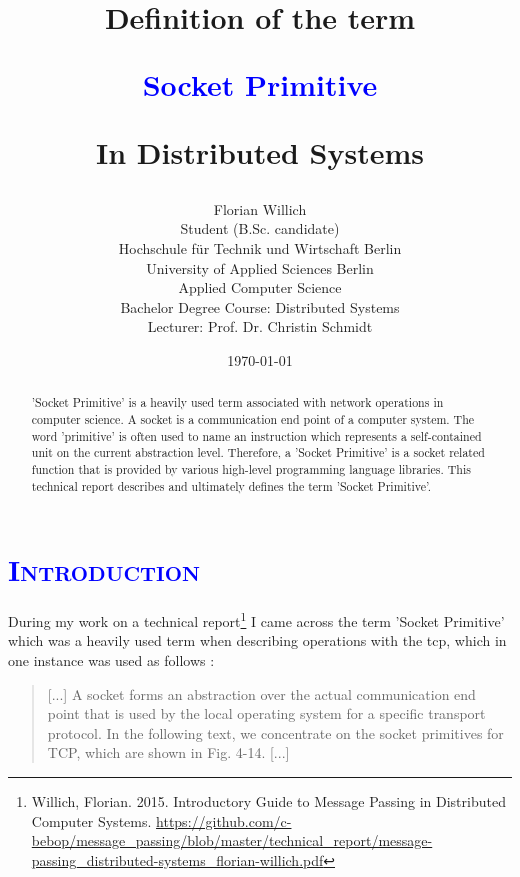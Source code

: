 \documentclass[xcolor=dvipsnames]{article}
\title{
\scshape{
\begin{large}
\textbf{Definition of the term}\\
\end{large}
\vspace{-4pt}
\textbf{\textcolor{blue}{Socket Primitive}}\\
\begin{large}
\vspace{-6pt}
In Distributed Systems
\end{large}
}}
\author{Florian Willich \\ Student (B.Sc. candidate) \\ Hochschule f\"ur Technik und Wirtschaft Berlin \\ University of Applied Sciences Berlin \\ Applied Computer Science \\ Bachelor Degree Course: Distributed Systems \\ Lecturer: Prof. Dr. Christin Schmidt}
\date{\today}
\begin{document}

\begin{titlepage}

\maketitle

\begin{abstract}
'Socket Primitive' is a heavily used term associated with network operations in computer science. A socket is a communication end point of a computer system. The word 'primitive' is often used to name an instruction which represents a self-contained unit on the current abstraction level. Therefore, a 'Socket Primitive' is a socket related function that is provided by various high-level programming language libraries. This technical report describes and ultimately defines the term 'Socket Primitive'.
\end{abstract}

\end{titlepage}

\newpage

\tableofcontents

\newpage



\section{\scshape{\textcolor{blue}{Introduction}}} \label{introduction}

During my work on a technical report\footnote{Willich, Florian. 2015. Introductory Guide to Message Passing in Distributed Computer Systems. \url{https://github.com/c-bebop/message_passing/blob/master/technical_report/message-passing_distributed-systems_florian-willich.pdf}} I came across the term 'Socket Primitive' which was a heavily used term when describing operations with the \gls{tcp}, which in one instance was used as follows \cite[p. 141, ch. 4.3.1]{tanenbaum}:

\begin{quote}\label{tanenbaum_quote}
[...] A socket forms an abstraction over the actual communication end
point that is used by the local operating system for a specific
transport protocol. In the following text, we concentrate on the socket
primitives for TCP, which are shown in Fig. 4-14. [...] 
\end{quote}
\end{document}
